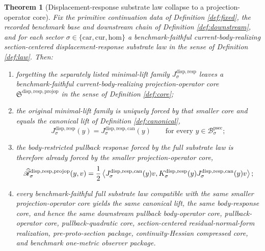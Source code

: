 \documentclass[11pt]{article}
\newcommand{\Car}{\mathrm{car}}
\newcommand{\Cur}{\mathrm{cur}}
\newcommand{\Hom}{\mathrm{hom}}
\newcommand{\ProtoSectionBody}[1]{\mathcal B_{#1}^{\mathrm{psec}}}
\newcommand{\ProjectionOperatorCore}{\mathfrak S^{\mathrm{disp,resp,projop}}}
\newcommand{\SubstrateOperator}[1]{K_{#1}^{\mathrm{disp,resp}}}
\newcommand{\SubstrateLift}[1]{J_{#1}^{\mathrm{disp,resp}}}
\newcommand{\CanonicalLift}[1]{J_{#1}^{\mathrm{disp,resp,can}}}
\newcommand{\CoreForcedBodyResponse}[1]{\widehat{\mathscr R}_{#1}^{\mathrm{disp,resp,projop}}}
\newtheorem{theorem}{Theorem}
\begin{document}
\begin{theorem}[Displacement-response substrate law collapse to a projection-operator core]
\label{thm:main}
Fix the primitive continuation data of Definition \ref{def:fixed}, the recorded benchmark base and downstream chain of Definition \ref{def:downstream}, and for each sector \(\sigma\in\{\Car,\Cur,\Hom\}\) a benchmark-faithful current-body-realizing section-centered displacement-response substrate law in the sense of Definition \ref{def:law}. Then:
\begin{enumerate}
    \item forgetting the separately listed minimal-lift family \(\SubstrateLift{\sigma}\) leaves a benchmark-faithful current-body-realizing projection-operator core \(\ProjectionOperatorCore\) in the sense of Definition \ref{def:core};
    \item the original minimal-lift family is uniquely forced by that smaller core and equals the canonical lift of Definition \ref{def:canonical},
    \[
    \SubstrateLift{\sigma}(y)=\CanonicalLift{\sigma}(y)
    \qquad
    \text{for every }
    y\in\ProtoSectionBody{\sigma};
    \]
    \item the body-restricted pullback response forced by the full substrate law is therefore already forced by the smaller projection-operator core,
    \[
    \CoreForcedBodyResponse{\sigma}(y,v)
    =
    \frac{1}{2}
    \ev{
    \CanonicalLift{\sigma}(y)v,
    \SubstrateOperator{\sigma}(y)\CanonicalLift{\sigma}(y)v
    };
    \]
    \item every benchmark-faithful full substrate law compatible with the same smaller projection-operator core yields the same canonical lift, the same body-response core, and hence the same downstream pullback body-operator core, pullback-operator core, pullback-quadratic core, section-centered residual-normal-form realization, pre-proto-section package, continuity-Hessian compressed core, and benchmark one-metric observer package.
\end{enumerate}
\end{theorem}
\end{document}
